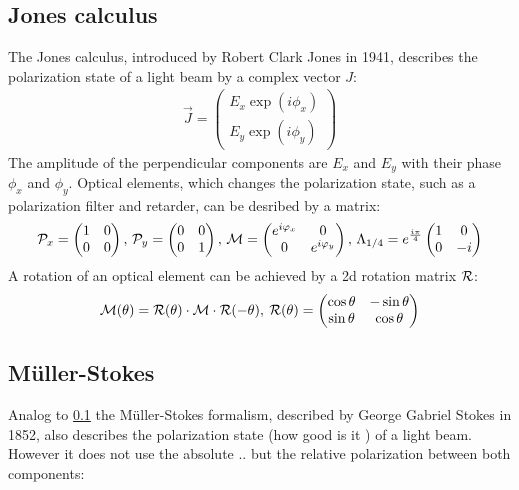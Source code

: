 \subsection{Jones calculus}
\label{sec:jones}
% 
The Jones calculus, introduced by Robert Clark Jones in 1941, describes the polarization state of a light beam by a complex vector $J$:
% 
\begin{align}
    \vec{J} = \begin{pmatrix} E_x \exp(i \phi_x) \\ E_y \exp(i \phi_y) \end{pmatrix}
\end{align}
% 
The amplitude of the perpendicular components are $E_x$ and $E_y$ with their phase $\phi_x$ and $\phi_y$.
Optical elements, which changes the polarization state, such as a polarization filter and retarder, can be desribed by a matrix:
% 
\begin{align}
\begin{split}
\mathcal{P}_x = 
\begin{pmatrix}
1 & 0 \\ 0 & 0
\end{pmatrix}
, \,
\mathcal{P}_y = 
\begin{pmatrix}
0 & 0 \\ 0 & 1
\end{pmatrix}
, \,
\mathcal{M} =
\begin{pmatrix}
e^{i \varphi_x} & 0 \\ 0 & e^{i \varphi_y}
\end{pmatrix}
, \,
\Lambda_{1/4}=
e^{\frac{i \pi}{4}}
\begin{pmatrix}
1 & 0 \\ 0 & -i
\end{pmatrix}
\end{split}
\end{align}
% 
A rotation of an optical element can be achieved by a 2d rotation matrix $\mathcal{R}$:
% 
\begin{align}
\begin{split}
\mathcal{M}(\theta )=\mathcal{R}(\theta )\cdot\mathcal{M}\cdot\mathcal{R}(-\theta )
, \>
\mathcal{R}(\theta ) = 
\begin{pmatrix}
\cos \theta & -\sin \theta \\
\sin \theta & \cos \theta
\end{pmatrix}
\end{split}
\end{align}
% 
% 
% 
\subsection{M\"uller-Stokes}\label{sec:Mueller-Stokes}
\label{sec:mueller_stokes}
% 
Analog to \cref{sec:jones} the M\"uller-Stokes formalism, described by George Gabriel Stokes in 1852, also describes the polarization state (how good is it \dummy{}) of a light beam.
However it does not use the absolute .. but the relative polarization between both components:
% 
